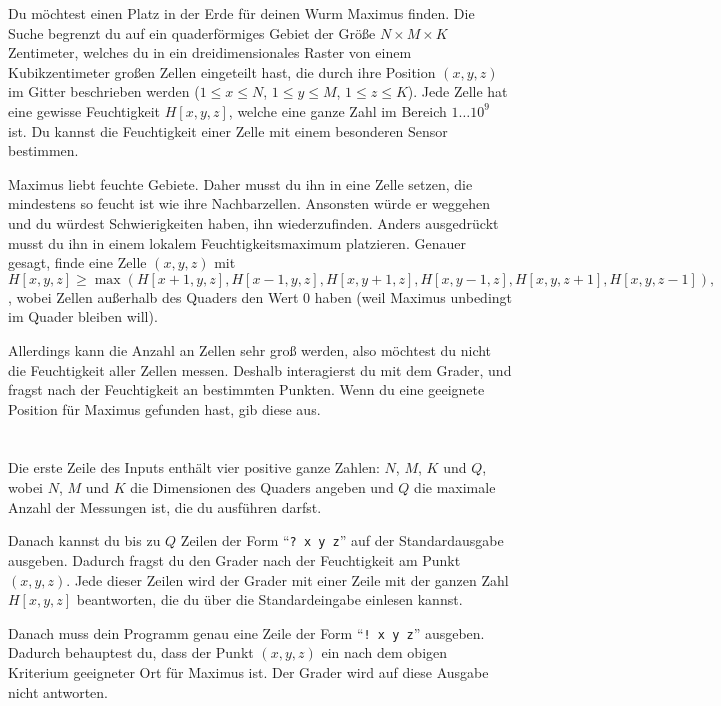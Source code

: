 \ifx\boi\undefined\fi
\def\version{jury-1}

Du möchtest einen Platz in der Erde für deinen Wurm Maximus finden. Die Suche begrenzt du auf ein quaderförmiges Gebiet der Größe $N \times M \times K$ Zentimeter, welches du in ein dreidimensionales Raster von einem Kubikzentimeter großen Zellen eingeteilt hast, die durch ihre Position $(x,y,z)$ im Gitter beschrieben werden ($1 \le x \le N$, $1 \le y \le M$, $1 \le z \le K$).
Jede Zelle hat eine gewisse Feuchtigkeit $H[x,y,z]$, welche eine ganze Zahl im Bereich $1 \dots 10^9$ ist.
Du kannst die Feuchtigkeit einer Zelle mit einem besonderen Sensor bestimmen.

Maximus liebt feuchte Gebiete. Daher musst du ihn in eine Zelle setzen, die mindestens so feucht ist wie ihre Nachbarzellen. Ansonsten würde er weggehen und du würdest Schwierigkeiten haben, ihn wiederzufinden.
Anders ausgedrückt musst du ihn in einem lokalem Feuchtigkeitsmaximum platzieren. Genauer gesagt, finde eine Zelle $(x,y,z)$ mit
$$
H[x,y,z] \ge \max(H[x+1,y,z], H[x-1,y,z], H[x,y+1,z], H[x,y-1,z], H[x,y,z+1], H[x,y,z-1]),
$$,
wobei Zellen außerhalb des Quaders den Wert $0$ haben (weil Maximus unbedingt im Quader bleiben will).

Allerdings kann die Anzahl an Zellen sehr groß werden, also möchtest du nicht die Feuchtigkeit aller Zellen messen.
Deshalb interagierst du mit dem Grader, und fragst nach der Feuchtigkeit an bestimmten Punkten.
Wenn du eine geeignete Position für Maximus gefunden hast, gib diese aus.

\section*{\interactivity}
Die erste Zeile des Inputs enthält vier positive ganze Zahlen: $N$, $M$, $K$ und $Q$, wobei $N$, $M$ und $K$ die Dimensionen des Quaders angeben und $Q$ die maximale Anzahl der Messungen ist, die du ausführen darfst.

Danach kannst du bis zu $Q$ Zeilen der Form ``\texttt{?\ x y z}'' auf der Standardausgabe ausgeben.
Dadurch fragst du den Grader nach der Feuchtigkeit am Punkt $(x, y, z)$.
Jede dieser Zeilen wird der Grader mit einer Zeile mit der ganzen Zahl $H[x,y,z]$ beantworten, die du über die Standardeingabe einlesen kannst. 

Danach muss dein Programm genau eine Zeile der Form ``\texttt{!\ x y z}'' ausgeben.
Dadurch behauptest du, dass der Punkt $(x, y, z)$ ein nach dem obigen Kriterium geeigneter Ort für Maximus ist.
Der Grader wird auf diese Ausgabe nicht antworten.

